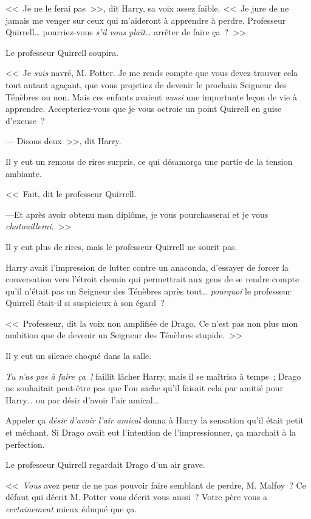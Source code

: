 <<~Je ne le ferai pas~>>, dit Harry, sa voix assez faible. <<~Je jure de ne jamais me venger sur ceux qui m'aideront à apprendre à perdre. Professeur Quirrell… pourriez-vous \emph{s'il vous plaît}… arrêter de faire ça~?~>>

Le professeur Quirrell soupira.

<<~Je \emph{suis} navré, M. Potter. Je me rends compte que vous devez trouver cela tout autant agaçant, que vous projetiez de devenir le prochain Seigneur des Ténèbres ou non. Mais ces enfants avaient \emph{aussi} une importante leçon de vie à apprendre. Accepteriez-vous que je vous octroie un point Quirrell en guise d'excuse~?

--- Disons deux~>>, dit Harry.

Il y eut un remous de rires surpris, ce qui désamorça une partie de la tension ambiante.

<<~Fait, dit le professeur Quirrell.

---Et après avoir obtenu mon diplôme, je vous pourchasserai et je vous \emph{chatouillerai}.~>>

Il y eut plus de rires, mais le professeur Quirrell ne sourit pas.

Harry avait l'impression de lutter contre un anaconda, d'essayer de forcer la conversation vers l'étroit chemin qui permettrait aux gens de se rendre compte qu'il n'était pas un Seigneur des Ténèbres après tout… \emph{pourquoi} le professeur Quirrell était-il si suspicieux à son égard~?

<<~Professeur, dit la voix non amplifiée de Drago. Ce n'est pas non plus mon ambition que de devenir un Seigneur des Ténèbres stupide.~>>

Il y eut un silence choqué dans la salle.

\emph{Tu n'as pas à faire ça~!} faillit lâcher Harry, mais il se maîtrisa à temps~; Drago ne souhaitait peut-être pas que l'on sache qu'il faisait cela par amitié pour Harry… ou par désir d'avoir l'air amical…

Appeler ça \emph{désir d'avoir l'air amical} donna à Harry la sensation qu'il était petit et méchant. Si Drago avait eut l'intention de l'impressionner, ça marchait à la perfection.

Le professeur Quirrell regardait Drago d'un air grave.

<<~\emph{Vous} avez peur de ne pas pouvoir faire semblant de perdre, M. Malfoy~? Ce défaut qui décrit M. Potter vous décrit vous aussi~? Votre père vous a \emph{certainement} mieux éduqué que ça.

